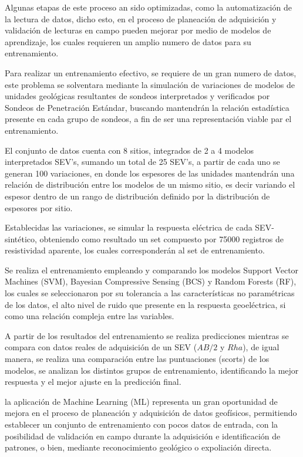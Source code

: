 Algunas etapas de este proceso an sido optimizadas, como la automatización de la lectura de datos, dicho esto, en el proceso de planeación de adquisición y validación de lecturas en campo pueden mejorar por medio de modelos de aprendizaje, los cuales requieren un amplio numero de datos para su entrenamiento.

Para realizar un entrenamiento efectivo, se requiere de un gran numero de datos, este problema se solventara mediante la simulación de variaciones de modelos de unidades geológicas resultantes de sondeos interpretados y verificados por Sondeos de Penetración Estándar, buscando mantendrán la relación estadística presente en cada grupo de sondeos, a fin de ser una representación viable par el entrenamiento.

El conjunto de datos cuenta con 8 sitios, integrados de 2 a 4 modelos interpretados SEV's, sumando un total de 25 SEV's, a partir de cada uno se generan 100 variaciones, en donde los espesores de las unidades mantendrán una relación de distribución entre los modelos de un mismo sitio, es decir variando el espesor dentro de un rango de distribución definido por la distribución de espesores por sitio.\ 

Establecidas las variaciones, se simular la respuesta eléctrica de cada SEV-sintético, obteniendo como resultado un set compuesto por 75000 registros de resistividad aparente, los cuales corresponderán al set de entrenamiento.

Se realiza el entrenamiento empleando y comparando los modelos Support Vector Machines (SVM), Bayesian Compressive Sensing (BCS) y Random Forests (RF), los cuales se seleccionaron por su tolerancia a las características no paramétricas de los datos, el alto nivel de ruido que presente en la respuesta geoeléctrica, si como una relación compleja entre las variables.%

A partir de los resultados del entrenamiento se realiza predicciones mientras se compara con datos reales de adquisición de un SEV ($AB/2$ y $Rha$), de igual manera, se realiza una comparación entre las puntuaciones (scorts) de los modelos, se analizan los distintos grupos de entrenamiento, identificando la mejor respuesta y el mejor ajuste en la predicción final.

la aplicación de Machine Learning (ML) representa un gran oportunidad de mejora en el proceso de planeación y adquisición de datos geofísicos, permitiendo establecer un conjunto de entrenamiento con pocos datos de entrada, con la posibilidad de validación en campo durante la adquisición e identificación de patrones, o bien, mediante reconocimiento geológico o expoliación directa.


